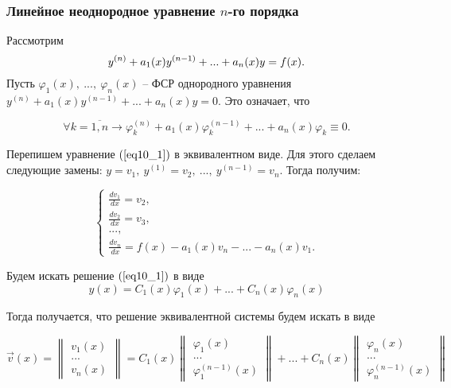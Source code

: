 \subsubsection{Линейное неоднородное уравнение $n$-го порядка}

Рассмотрим
\begin{equation}\label{eq10_1}
    y^{(n)} + a_1(x)y^{(n-1)} + ... + a_n(x)y = f(x).\\
\end{equation}
Пусть $\varphi_1(x),~...,~\varphi_n(x)$ -- ФСР однородного уравнения $y^{(n)} + a_1(x)y^{(n-1)} + ... + a_n(x)y = 0$. Это означает, что 

\begin{equation}\label{eq10_2}
    \forall k = \overline{1, n} \rightarrow \varphi_k^{(n)} + a_1(x)\varphi_k^{(n-1)} + ... + a_n(x)\varphi_k \equiv 0.
\end{equation}

Перепишем уравнение $(\ref{eq10_1})$ в эквивалентном виде. Для этого сделаем следующие замены: $y = v_1, ~y^{(1)} = v_2,~..., ~y^{(n-1)} = v_n$. Тогда получим:

\begin{equation}\label{eq10_3}
    \begin{cases}
        \frac{dv_1}{dx} = v_2, 
        \\
        \frac{dv_2}{dx} = v_3,
        \\
        ...,
        \\
        \frac{dv_n}{dx} = f(x) - a_1(x)v_n - ... - a_n(x)v_1.
    \end{cases}
\end{equation}

Будем искать решение $(\ref{eq10_1})$ в виде
\[y(x) = C_1(x)\varphi_1(x) + ... + C_n(x)\varphi_n(x)\]

Тогда получается, что решение эквивалентной системы будем искать в виде

\begin{equation}
\overrightarrow{v}(x) = 
    \begin{Vmatrix}
        v_1(x)\\
        ...\\
        v_n(x)
    \end{Vmatrix} = C_1(x)
    \begin{Vmatrix}
        \varphi_1(x)\\
        ...\\
        \varphi_1^{(n-1)}(x)
    \end{Vmatrix} + ... + C_n(x)
    \begin{Vmatrix}
        \varphi_n(x)\\
        ...\\
        \varphi_n^{(n-1)}(x)
    \end{Vmatrix}
\end{equation}

